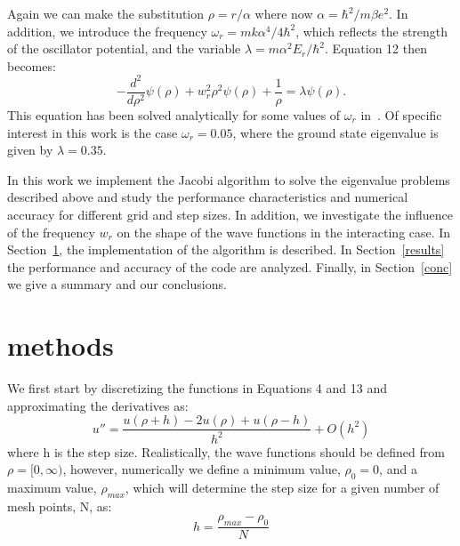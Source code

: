 \documentclass[prc,amsmath,twocolumn,superscriptaddress]{revtex4}
\begin{document}
Again we can make the substitution $\rho=r/\alpha$ where now $\alpha=\hbar^2/m\beta e^2$. In addition, we introduce the frequency $\omega_r=mk\alpha^4/4\hbar^2$, which reflects the strength of the oscillator potential, and the variable $\lambda = m\alpha^2E_r/\hbar^2$. Equation 12 then becomes:
\begin{equation}
-\frac{d^2}{d\rho^2}\psi(\rho)+w_r^2\rho^2\psi(\rho)+\frac{1}{\rho}=\lambda\psi(\rho).
\end{equation}
This equation has been solved analytically for some values of $\omega_r$ in~\cite{interact}. Of specific interest in this work is the case $\omega_r=0.05$, where the ground state eigenvalue is given by $\lambda=0.35$.

In this work we implement the Jacobi algorithm to solve the eigenvalue problems described above and study the performance characteristics and numerical accuracy for different grid and step sizes. In addition, we investigate the influence of the frequency $w_r$ on the shape of the wave functions in the interacting case. In Section~\ref{methods}, the implementation of the algorithm is described. In Section~\ref{results} the performance and accuracy of the code are analyzed. Finally, in Section~\ref{conc} we give a summary and our conclusions.

\section{methods}
\label{methods}
We first start by discretizing the functions in Equations 4 and 13 and approximating the derivatives as:
\begin{equation}
u''=\frac{u(\rho+h)-2u(\rho)+u(\rho-h)}{h^2}+O(h^2)
\end{equation}
where h is the step size. Realistically, the wave functions should be defined from $\rho=[0,\infty)$, however, numerically we define a minimum value, $\rho_0=0$, and a maximum value, $\rho_{max}$, which will determine the step size for a given number of mesh points, N, as:
\begin{equation}
h=\frac{\rho_{max}-\rho_0}{N}
\end{equation}
\end{document}
